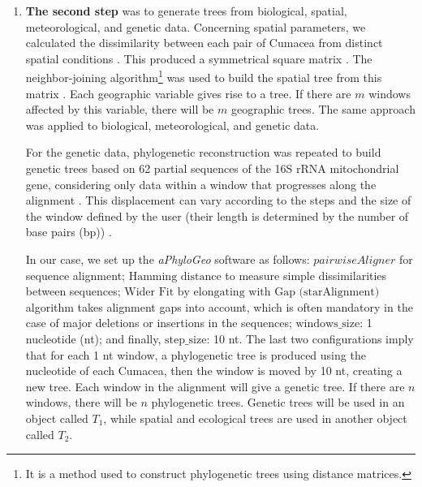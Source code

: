 {\begin{enumerate}
\item \textbf{The second step} was to generate trees from biological, spatial, meteorological, and genetic data. Concerning spatial parameters, we calculated the dissimilarity between each pair of Cumacea from distinct spatial conditions \citep{koshkarov_phylogeography_2022}. This produced a symmetrical square matrix \citep{koshkarov_phylogeography_2022}. The {neighbor-joining algorithm}\footnote{It is a method used to construct phylogenetic trees using distance matrices.} was used to build the spatial tree from this matrix \citep{koshkarov_phylogeography_2022}. Each geographic variable gives rise to a tree. If there are $m$ windows affected by this variable, there will be $m$ geographic trees. The same approach was applied to biological, meteorological, and genetic data.

For the genetic data, phylogenetic reconstruction was repeated to build genetic trees based on 62 partial sequences of the 16S rRNA mitochondrial gene, considering only data within a window that progresses along the alignment \citep{koshkarov_phylogeography_2022}. This displacement can vary according to the steps and the size of the window defined by the user (their length is determined by the number of base pairs (bp)) \citep{koshkarov_phylogeography_2022}.

In our case, we set up the \textit{aPhyloGeo} software as follows: $pairwiseAligner$ for sequence alignment; $\text{Hamming distance}$ to measure simple dissimilarities between sequences; $\text{Wider Fit by elongating with Gap (starAlignment)}$ algorithm takes alignment gaps into account, which is often mandatory in the case of major deletions or insertions in the sequences; $\text{windows\_size}$: 1 nucleotide (nt); and finally, $\text{step\_size}$: 10 nt. The last two configurations imply that for each 1 nt window, a phylogenetic tree is produced using the nucleotide of each Cumacea, then the window is moved by 10 nt, creating a new tree. Each window in the alignment will give a genetic tree. If there are $n$ windows, there will be $n$ phylogenetic trees. Genetic trees will be used in an object called $T_1$, while spatial and ecological trees are used in another object called $T_2$.


\end{enumerate}}
